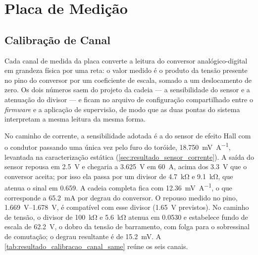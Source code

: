 \section{Placa de Medição}
\label{sec:resultado_validacao_same}
\label{sec:resultado_validacao_siba}

\subsection{Calibração de Canal}
\label{sec:resultado_calibracao_canal_same}

Cada canal de medida da placa converte a leitura do conversor
analógico-digital em grandeza física por uma reta: o valor medido é o produto
da tensão presente no pino do conversor por um coeficiente de escala, somado a
um deslocamento de zero. Os dois números saem do projeto da cadeia --- a
sensibilidade do sensor e a atenuação do divisor --- e ficam no arquivo de
configuração compartilhado entre o \textit{firmware} e a aplicação de
supervisão, de modo que as duas pontas do sistema interpretam a mesma leitura
da mesma forma.

No caminho de corrente, a sensibilidade adotada é a do sensor de efeito Hall
com o condutor passando uma única vez pelo furo do toróide,
\SI{18,750}{\milli\volt\per\ampere}, levantada na caracterização estática
(\autoref{sec:resultado_sensor_corrente}). A saída do sensor repousa em
\SI{2,5}{\volt} e chegaria a \SI{3,625}{\volt} em \SI{60}{\ampere}, acima dos
\SI{3,3}{\volt} que o conversor aceita; por isso ela passa por um divisor de
\SI{4,7}{\kilo\ohm} e \SI{9,1}{\kilo\ohm}, que atenua o sinal em \num{0,659}. A
cadeia completa fica com \SI{12,36}{\milli\volt\per\ampere}, o que corresponde
a \SI{65,2}{\milli\ampere} por degrau do conversor. O repouso medido no pino,
\SIrange{1,669}{1,678}{\volt}, é compatível com esse divisor
(\SI{1,65}{\volt} previstos). No caminho de tensão, o
divisor de \SI{100}{\kilo\ohm} e \SI{5,6}{\kilo\ohm} atenua em \num{0,0530} e
estabelece fundo de escala de \SI{62,2}{\volt}, o dobro da tensão de
barramento, com folga para o sobressinal de comutação; o degrau resultante é
de \SI{15,2}{\milli\volt}. A \autoref{tab:resultado_calibracao_canal_same}
reúne os seis canais.

